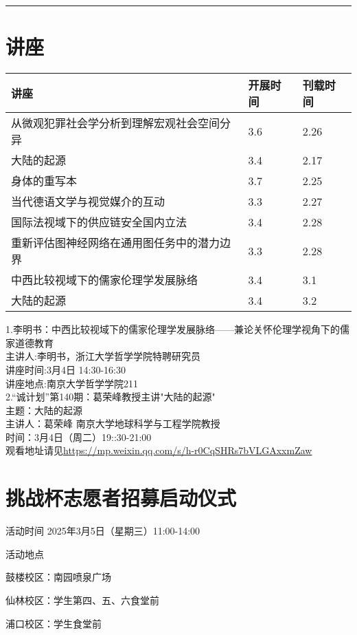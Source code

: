 \documentclass[letterpaper, 12pt]{article}
\begin{document}
\hrule
\pagebreak
\begin{multicols}{2}

\section{讲座}
\begin{tabular}{|>{\centering\arraybackslash}m{}|m{}|m{}|}
    \hline
    讲座 & 开展时间 & 刊载时间\\
    \hline\hline
    从微观犯罪社会学分析到理解宏观社会空间分异   &3.6  &2.26 \\\hline
    大陆的起源 & 3.4 & 2.17\\\hline
    身体的重写本 & 3.7 & 2.25\\\hline
    当代德语文学与视觉媒介的互动 & 3.3 & 2.27\\\hline
    国际法视域下的供应链安全国内立法 & 3.4 & 2.28\\\hline
    重新评估图神经网络在通用图任务中的潜力边界 & 3.3 & 2.28\\\hline
    中西比较视域下的儒家伦理学发展脉络 & 3.4 & 3.1\\\hline
    大陆的起源 & 3.4 & 3.2\\\hline
\end{tabular}
1.李明书：中西比较视域下的儒家伦理学发展脉络——兼论关怀伦理学视角下的儒家道德教育\\
主讲人:李明书，浙江大学哲学学院特聘研究员\\
讲座时间:3月4日 14:30-16:30\\
讲座地点:南京大学哲学学院211\\

2.“诚计划”第140期：葛荣峰教授主讲"大陆的起源"\\
主题：大陆的起源\\
主讲人：葛荣峰 南京大学地球科学与工程学院教授\\
时间：3月4日（周二）19::30-21:00\\
观看地址请见\url{https://mp.weixin.qq.com/s/h-r0CqSHRs7bVLGAxxmZaw} 
\section{挑战杯志愿者招募启动仪式}
活动时间 2025年3月5日（星期三）11:00-14:00

活动地点

鼓楼校区：南园喷泉广场

仙林校区：学生第四、五、六食堂前

浦口校区：学生食堂前


\end{multicols}
\end{document}
